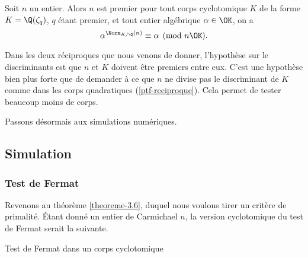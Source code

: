 \begin{theoreme}
	Soit $n$ un entier. Alors $n$ est premier \ssi pour tout corps cyclotomique $K$ de la forme $K = \Q(\zeta_q)$, $q$ étant premier, et tout entier algébrique $\alpha\in \OK$, on a $$\alpha^{\Norm_{K/\Q}(n)} \equiv \alpha \pmod{n\OK}.$$
\end{theoreme}

\begin{remarque}
	Dans les deux réciproques que nous venons de donner, l'hypothèse sur le discriminants est que $n$ et $K$ doivent être premiers entre eux. C'est une hypothèse bien plus forte que de demander à ce que $n$ ne divise pas le discriminant de $K$ comme dans les corps quadratiques (\ref{ptf-reciproque}). Cela permet de tester beaucoup moins de corps.
\end{remarque}

Passons désormais aux simulations numériques.

\subsection{Simulation}

\subsubsection{Test de Fermat}

Revenons au théorème \ref{theoreme-3.6}, duquel nous voulons tirer un critère de primalité. Étant donné un entier de Carmichael $n$, la version \og cyclotomique \fg{} du test de Fermat serait la suivante.

\vspace{1em}
\begin{algorithm}[H]\label{test-Fermat-cyclotomique}
\caption{Test de Fermat dans un corps cyclotomique}
\end{algorithm}
\vspace{1em}

